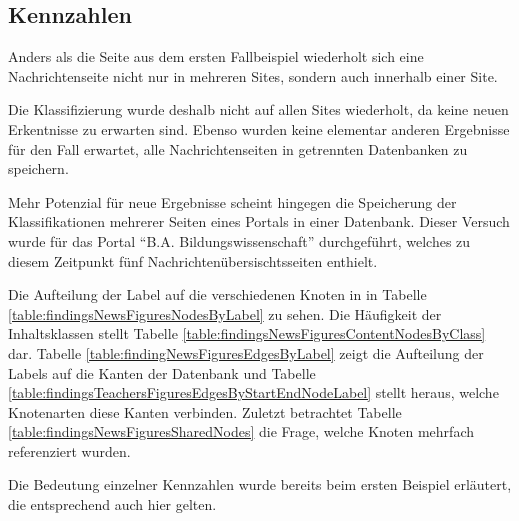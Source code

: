 \subsection{Kennzahlen}
    Anders als die Seite aus dem ersten Fallbeispiel wiederholt sich
    eine Nachrichtenseite nicht nur in mehreren Sites,
    sondern auch innerhalb einer Site.

    Die Klassifizierung wurde deshalb nicht auf allen Sites wiederholt,
    da keine neuen Erkentnisse zu erwarten sind.
    Ebenso wurden keine elementar anderen Ergebnisse für den Fall erwartet,
    alle Nachrichtenseiten in getrennten Datenbanken zu speichern.

    Mehr Potenzial für neue Ergebnisse scheint hingegen die Speicherung
    der Klassifikationen mehrerer Seiten eines Portals in einer Datenbank.
    Dieser Versuch wurde für das Portal "`B.A. Bildungswissenschaft"' durchgeführt,
    welches zu diesem Zeitpunkt fünf Nachrichtenübersischtsseiten enthielt.

    Die Aufteilung der Label auf die verschiedenen Knoten in in Tabelle
    \ref{table:findingsNewsFiguresNodesByLabel} zu sehen.
    Die Häufigkeit der Inhaltsklassen stellt Tabelle
    \ref{table:findingsNewsFiguresContentNodesByClass} dar.
    Tabelle \ref{table:findingNewsFiguresEdgesByLabel} zeigt die Aufteilung
    der Labels auf die Kanten der Datenbank und Tabelle
    \ref{table:findingsTeachersFiguresEdgesByStartEndNodeLabel}
    stellt heraus, welche Knotenarten diese Kanten verbinden.
    Zuletzt betrachtet Tabelle \ref{table:findingsNewsFiguresSharedNodes}
    die Frage, welche Knoten mehrfach referenziert wurden.

    Die Bedeutung einzelner Kennzahlen wurde bereits beim ersten Beispiel erläutert,
    die entsprechend auch hier gelten.

